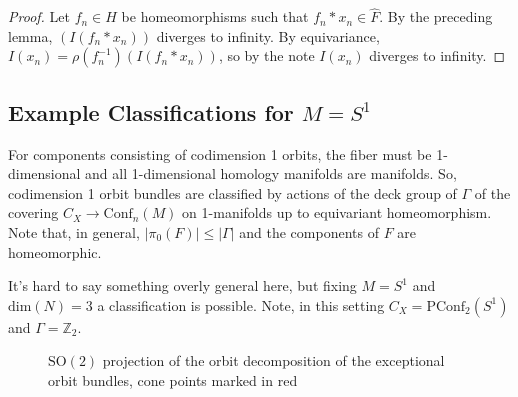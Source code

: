 \documentclass[10pt, oneside]{article}
\newcommand{\Z}{\mathbb{Z}}
\newcommand{\SO}[1][2]{\text{SO}(#1)}
\newcommand{\conf}[2][S^1]{\text{Conf}_{#2}(#1)}
\newcommand{\pconf}[2][S^1]{\text{PConf}_{#2}(#1)}
\theoremstyle{definition}
\theoremstyle{definition}
\begin{document}
\begin{proof}
    Let $f_n\in H$ be homeomorphisms such that $f_n*x_n\in \hat{F}$. By the preceding lemma, $(I(f_n*x_n))$ diverges to infinity. By equivariance, $I(x_n) = \rho(f_n^{-1})(I(f_n*x_n))$, so by the note $I(x_n)$ diverges to infinity. 
\end{proof}

\subsection{Example Classifications for \texorpdfstring{$M=S^1$}{M=S\string^1}}\label{subsec:example-orbit-bundle-classif}
For components consisting of codimension 1 orbits, 
the fiber must be 1-dimensional 
and all 1-dimensional homology manifolds are manifolds. 
So, 
codimension 1 orbit bundles are classified 
by actions of the deck group of $\Gamma$ 
of the covering $C_X \to \conf[M]{n}$ on 1-manifolds 
up to equivariant homeomorphism.
Note that, 
in general, $\lvert \pi_0(F) \rvert \leq \lvert \Gamma \rvert$ 
and the components of $F$ are homeomorphic. 

It's hard to say something overly general here, 
but fixing $M = S^1$ 
and $\text{dim}(N)=3$ a classification is possible. 
Note, in this setting $C_X = \pconf{2}$ and $\Gamma = \Z_2$.

\begin{figure}
    \centering
    
    \caption{$\SO$ projection of the orbit decomposition of the exceptional orbit bundles, cone points marked in red}
    \label{fig:orbit-bundle-bases}
\end{figure}
\end{document}
